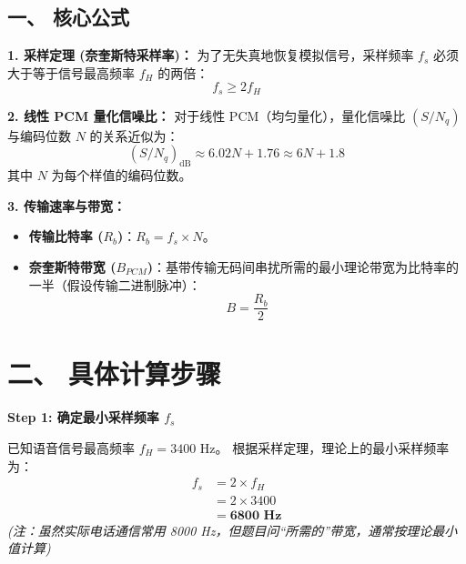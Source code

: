 \documentclass[a4paper,11pt]{ctexart}
\begin{document}
\begin{tcolorbox}[colback=white, colframe=blue!50!black, title=\textbf{题目解答：10-17 线性 PCM 系统所需奈奎斯特带宽}]

    \section*{一、 核心公式}
    
    \textbf{1. 采样定理 (奈奎斯特采样率)：}
    为了无失真地恢复模拟信号，采样频率 $f_s$ 必须大于等于信号最高频率 $f_H$ 的两倍：
    \begin{equation}
        f_s \ge 2 f_H
    \end{equation}
    
    \textbf{2. 线性 PCM 量化信噪比：}
    对于线性 PCM（均匀量化），量化信噪比 $(S/N_q)$ 与编码位数 $N$ 的关系近似为：
    \begin{equation}
        (S/N_q)_{\text{dB}} \approx 6.02 N + 1.76 \approx 6N + 1.8
    \end{equation}
    其中 $N$ 为每个样值的编码位数。
    
    \textbf{3. 传输速率与带宽：}
    \begin{itemize}
        \item \textbf{传输比特率 ($R_b$)}：$R_b = f_s \times N$。
        \item \textbf{奈奎斯特带宽 ($B_{PCM}$)}：基带传输无码间串扰所需的最小理论带宽为比特率的一半（假设传输二进制脉冲）：
        \begin{equation}
            B = \frac{R_b}{2}
        \end{equation}
    \end{itemize}

    \end{tcolorbox}

    \section*{二、 具体计算步骤}
    
    \textbf{Step 1: 确定最小采样频率 $f_s$}
    
    已知语音信号最高频率 $f_H = 3400 \text{ Hz}$。
    根据采样定理，理论上的最小采样频率为：
    \begin{align*}
        f_s &= 2 \times f_H \\
            &= 2 \times 3400 \\
            &= \mathbf{6800 \text{ Hz}}
    \end{align*}
    \textit{(注：虽然实际电话通信常用 8000 Hz，但题目问“所需的”带宽，通常按理论最小值计算)}
    
\end{document}
